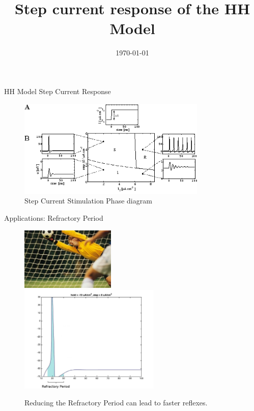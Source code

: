 \documentclass{beamer}
\title[A constant current applied to the HH model produces a train of action potentials.]{Step current response of the HH Model}
\author[E.Ioannidis \& J.Hobin] {\
   \texorpdfstring{\
        \begin{columns}
            \column{.45\linewidth}
            \centering
            Eleftherios Ioannidis\\
            \href{mailto:elefthei@mit.edu}{elefthei@mit.edu}
            \column{.45\linewidth}
            \centering
            James Hobin\\
            \href{mailto:hobinjk@mit.edu}{hobinjk@mit.edu}
        \end{columns}
   }
   {Eleftherios Ioannidis \& James Hobin}
}
\institute{MIT EECS}
\date{\today}
\begin{document}
\begin{frame}
  \titlepage{}
\end{frame}

\begin{frame}{HH Model Step Current Response}
  \begin{figure}
    \centering
    \includegraphics[width = 0.8\textwidth]{./pictures/gerstner.png}
    \caption{Step Current Stimulation Phase diagram}
  \end{figure}
\end{frame}

\begin{frame}{Applications: Refractory Period}
  \begin{figure}
    \centering
    \includegraphics[width = 0.4\textwidth]{./pictures/reflexes.jpg}
    \includegraphics[width = 0.6\textwidth]{./pictures/refractory.jpg}
    \caption{Reducing the Refractory Period can lead to faster reflexes.}
  \end{figure}
\end{frame}
\end{document}
